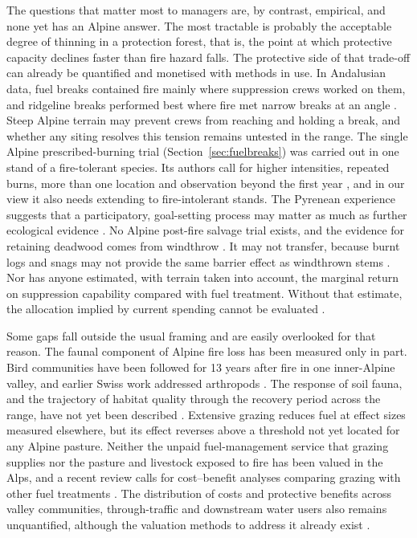 \documentclass[11pt,a4paper]{article}
\begin{document}
The questions that matter most to managers are, by contrast, empirical, and none yet has an Alpine answer. The most tractable is probably the acceptable degree of thinning in a protection forest, that is, the point at which protective capacity declines faster than fire hazard falls. The protective side of that trade-off can already be quantified \citep{costa_biological_2021} and monetised \citep{accastello_asforesee_2019, moos_climate_2021} with methods in use. In Andalusian data, fuel breaks contained fire mainly where suppression crews worked on them, and ridgeline breaks performed best where fire met narrow breaks at an angle \citep{ortega_modeling_2024}. Steep Alpine terrain may prevent crews from reaching and holding a break, and whether any siting resolves this tension remains untested in the range. The single Alpine prescribed-burning trial (Section~\ref{sec:fuelbreaks}) was carried out in one stand of a fire-tolerant species. Its authors call for higher intensities, repeated burns, more than one location and observation beyond the first year \citep{gamba_prescribed_2025}, and in our view it also needs extending to fire-intolerant stands. The Pyrenean experience suggests that a participatory, goal-setting process may matter as much as further ecological evidence \citep{oliveres_path_2025}. No Alpine post-fire salvage trial exists, and the evidence for retaining deadwood comes from windthrow \citep{costa_biological_2021, seben_impact_2024}. It may not transfer, because burnt logs and snags may not provide the same barrier effect as windthrown stems \citep{costa_biological_2021}. Nor has anyone estimated, with terrain taken into account, the marginal return on suppression capability compared with fuel treatment. Without that estimate, the allocation implied by current spending cannot be evaluated \citep{cardil_assessing_2025, brodie_forest_2024, muller_forest_2020}.

Some gaps fall outside the usual framing and are easily overlooked for that reason. The faunal component of Alpine fire loss has been measured only in part. Bird communities have been followed for 13 years after fire in one inner-Alpine valley, and earlier Swiss work addressed arthropods \citep{rey_effects_2019}. The response of soil fauna, and the trajectory of habitat quality through the recovery period across the range, have not yet been described \citep{degiuli_arrested_2024, arrogantefunes_mapping_2024}. Extensive grazing reduces fuel at effect sizes measured elsewhere, but its effect reverses above a threshold not yet located for any Alpine pasture. Neither the unpaid fuel-management service that grazing supplies nor the pasture and livestock exposed to fire has been valued in the Alps, and a recent review calls for cost--benefit analyses comparing grazing with other fuel treatments \citep{xu_how_2026}. The distribution of costs and protective benefits across valley communities, through-traffic and downstream water users also remains unquantified, although the valuation methods to address it already exist \citep{accastello_asforesee_2019, moos_climate_2021}.
\end{document}
